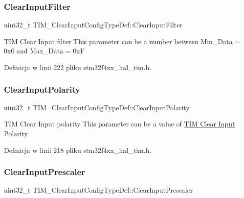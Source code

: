 \subsubsection{\texorpdfstring{Clear\+Input\+Filter}{ClearInputFilter}}
{\footnotesize\ttfamily uint32\+\_\+t T\+I\+M\+\_\+\+Clear\+Input\+Config\+Type\+Def\+::\+Clear\+Input\+Filter}

T\+IM Clear Input filter This parameter can be a number between Min\+\_\+\+Data = 0x0 and Max\+\_\+\+Data = 0xF 

Definicja w linii 222 pliku stm32f4xx\+\_\+hal\+\_\+tim.\+h.

\mbox{\label{struct_t_i_m___clear_input_config_type_def_a49dbc65edc5316822fcabd61cc8409de}} 
\subsubsection{\texorpdfstring{Clear\+Input\+Polarity}{ClearInputPolarity}}
{\footnotesize\ttfamily uint32\+\_\+t T\+I\+M\+\_\+\+Clear\+Input\+Config\+Type\+Def\+::\+Clear\+Input\+Polarity}

T\+IM Clear Input polarity This parameter can be a value of \hyperlink{group___t_i_m___clear_input___polarity}{T\+IM Clear Input Polarity} 

Definicja w linii 218 pliku stm32f4xx\+\_\+hal\+\_\+tim.\+h.

\mbox{\label{struct_t_i_m___clear_input_config_type_def_a509cecb64fec71391ddc8b4703e09cfe}} 
\subsubsection{\texorpdfstring{Clear\+Input\+Prescaler}{ClearInputPrescaler}}
{\footnotesize\ttfamily uint32\+\_\+t T\+I\+M\+\_\+\+Clear\+Input\+Config\+Type\+Def\+::\+Clear\+Input\+Prescaler}

